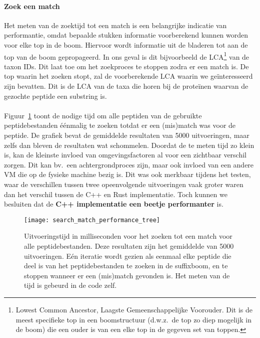 \paragraph{Zoek een match}
Het meten van de zoektijd tot een match is een belangrijke indicatie van performantie, omdat bepaalde stukken informatie voorberekend kunnen worden voor elke top in de boom.
Hiervoor wordt informatie uit de bladeren tot aan de top van de boom gepropageerd.
In ons geval is dit bijvoorbeeld de LCA\footnote{Lowest Common Ancestor, Laagste Gemeenschappelijke Voorouder. Dit is de meest specifieke top in een boomstructuur (d.w.z.~de top zo diep mogelijk in de boom) die een ouder is van een elke top in de gegeven set van toppen.\label{footnote:lca}} van de taxon IDs.
Dit laat toe om het zoekproces te stoppen zodra er een match is.
De top waarin het zoeken stopt, zal de voorberekende LCA waarin we geïnteresseerd zijn bevatten.
Dit is de LCA van de taxa die horen bij de proteïnen waarvan de gezochte peptide een substring is.
\\ \\
Figuur~\ref{fig:performance_match_tree} toont de nodige tijd om alle peptiden van de gebruikte peptidebestanden éénmalig te zoeken totdat er een (mis)match was voor de peptide.
De grafiek bevat de gemiddelde resultaten van 5000 uitvoeringen, maar zelfs dan bleven de resultaten wat schommelen.
Doordat de te meten tijd zo klein is, kan de kleinste invloed van omgevingsfactoren al voor een zichtbaar verschil zorgen.
Dit kan bv.~een achtergrondproces zijn, maar ook invloed van een andere VM die op de fysieke machine bezig is.
Dit was ook merkbaar tijdens het testen, waar de verschillen tussen twee opeenvolgende uitvoeringen vaak groter waren dan het verschil tussen de C++ en Rust implementatie.
Toch kunnen we besluiten dat de \textbf{C++ implementatie een beetje performanter} is.
\\
\begin{figure}[ht]
    \centering
    \texttt{[image: search\_match\_performance\_tree]}
    \caption{Uitvoeringstijd in milliseconden voor het zoeken tot een match voor alle peptidebestanden. Deze resultaten zijn het gemiddelde van 5000 uitvoeringen. Eén iteratie wordt gezien als eenmaal elke peptide die deel is van het peptidebestanden te zoeken in de suffixboom, en te stoppen wanneer er een (mis)match gevonden is. Het meten van de tijd is gebeurd in de code zelf.}
    \label{fig:performance_match_tree}
\end{figure}

